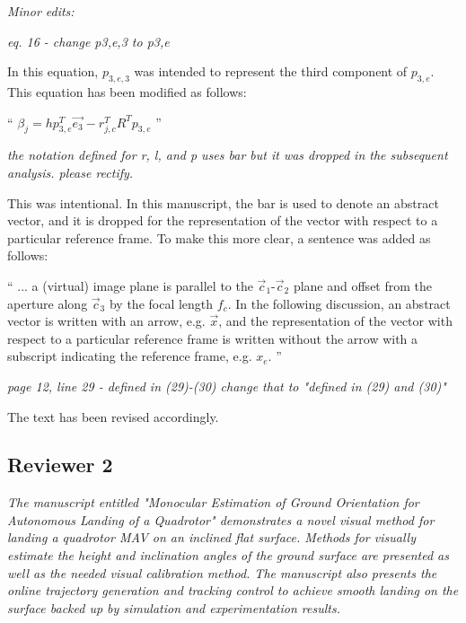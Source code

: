 \documentclass[11pt]{article}
\newenvironment{correction}{\begin{list}{}{\setlength{\leftmargin}{1cm}\setlength{\rightmargin}{1cm}}\vspace{\parsep}\item[]``}{''\end{list}}
\begin{document}
\noindent\textit{Minor edits:}

\begin{itemize}\setlength{\itemsep}{2\parsep}

\item
\textit{eq. 16 - change p3,e,3 to p3,e
}

In this equation, $p_{3,e,3}$ was intended to represent the third component of $p_{3,e}$. This equation has been modified as follows:

\begin{correction}
  $\beta_j = h p_{3,e}^T \vec{e_3} -
r_{j,c}^T R^T p_{3,e}$
\end{correction}

\item
\textit{the notation defined for r, l, and p uses bar but it was dropped in the subsequent analysis. 
please rectify.
}

This was intentional. In this manuscript, the bar is used to denote an abstract vector, and it is dropped for the representation of the vector with respect to a particular reference frame.
To make this more clear, a sentence was added as follows:
\begin{correction}
... a (virtual) image plane is
parallel to the $\vec{c}_1$-$\vec{c}_2$ plane and offset from the
aperture along $\vec{c}_3$ by the focal length $f_c$.
In the following discussion, an abstract vector is written with an arrow, e.g. $\vec{x}$, and the representation of the vector with respect to a particular reference frame is written without the arrow with a subscript indicating the reference frame, e.g. $x_e$.
\end{correction}


\item
\textit{page 12, line 29 - defined in (29)-(30) change that to "defined in (29) and (30)"
}

The text has been revised accordingly.

\end{itemize}

\subsection*{Reviewer 2}

\textit{The manuscript entitled "Monocular Estimation of Ground Orientation for Autonomous Landing of a Quadrotor" demonstrates a novel visual method for landing a quadrotor MAV on an inclined flat surface. 
Methods for visually estimate the height and inclination angles of the ground surface are presented as well as the needed visual calibration method. 
The manuscript also presents the online trajectory generation and tracking control to achieve smooth landing on the surface backed up by simulation and experimentation results. 
}
\end{document}
